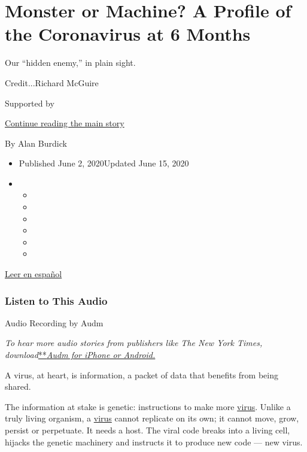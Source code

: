 \hypertarget{monster-or-machine-a-profile-of-the-coronavirus-at-6-months}{%
\section{Monster or Machine? A Profile of the Coronavirus at 6
Months}\label{monster-or-machine-a-profile-of-the-coronavirus-at-6-months}}

Our ``hidden enemy,'' in plain sight.

Credit...Richard McGuire

Supported by

\protect\hyperlink{after-sponsor}{Continue reading the main story}

By Alan Burdick

\begin{itemize}
\item
  Published June 2, 2020Updated June 15, 2020
\item
  \begin{itemize}
  \item
  \item
  \item
  \item
  \item
  \item
  \end{itemize}
\end{itemize}

\href{https://www.nytimes.com/es/2020/06/02/espanol/ciencia-y-tecnologia/perfil-coronavirus-covid.html}{Leer
en español}

\hypertarget{listen-to-this-audio}{%
\subsubsection{Listen to This Audio}\label{listen-to-this-audio}}

Audio Recording by Audm

\emph{To hear more audio stories from publishers like The New York
Times,
download}\href{https://www.audm.com/?utm_source=nytmag\&utm_medium=embed\&utm_campaign=left_behind_draper}{**}\href{https://www.audm.com/?utm_source=nyt\&utm_medium=embed\&utm_campaign=monster_or_machine}{\emph{Audm
for iPhone or Android.}}

A virus, at heart, is information, a packet of data that benefits from
being shared.

The information at stake is genetic: instructions to make more
\href{https://www.nytimes.com/2020/06/15/health/coronavirus-underlying-conditions.html}{virus}.
Unlike a truly living organism, a
\href{https://www.nytimes.com/2020/06/15/health/coronavirus-underlying-conditions.html}{virus}
cannot replicate on its own; it cannot move, grow, persist or
perpetuate. It needs a host. The viral code breaks into a living cell,
hijacks the genetic machinery and instructs it to produce new code ---
new virus.

